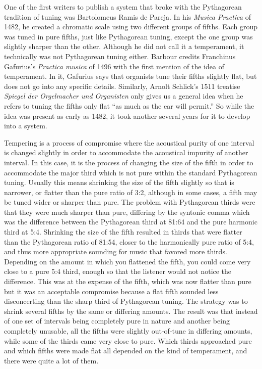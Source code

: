 One of the first writers to publish a system that broke with the Pythagorean
tradition of tuning was Bartolomeus Ramis de Pareja.  In his \textit{Musica Practica} of
1482, he created a chromatic scale using two different groups of fifths.  Each group was
tuned in pure fifths, just like Pythagorean tuning, except the one group was slightly
sharper than the other. \autocite[88]{MB:1}  Although he did not call it a temperament, it
technically was not Pythagorean tuning either.  Barbour credits Franchinus Gafurius's
\textit{Practica musica} of 1496 with the first mention of the idea of temperament.  In
it, Gafurius says that organists tune their fifths slightly flat, but does not go into any
specific details.\autocite[25]{MB:1} Similarly, Arnolt Schlick's 1511 treatise
\textit{Spiegel der Orgelmacher und Organisten} only gives us a general idea when he
refers to tuning the fifths only flat ``as much as the ear will permit.''
\autocite[202]{RR:1}  So while the idea was present as early as 1482, it took another
several years for it to develop into a system.

Tempering is a process of compromise where the acoustical purity of one interval is
changed slightly in order to accommodate the acoustical impurity of another interval.
In this case, it is the process of changing the size of the fifth in order to
accommodate the major third which is not pure within the standard Pythagorean tuning.
Usually this means shrinking the size of the fifth slightly so that is narrower, or
flatter than the pure ratio of 3:2, although in some cases, a fifth may be tuned wider or
sharper than pure. The problem with Pythagorean thirds were that they were much sharper
than pure, differing by the syntonic comma which was the difference between the
Pythagorean third at 81:64 and the pure harmonic third at 5:4. Shrinking the size of the
fifth resulted in thirds that were flatter than the Pythagorean ratio of 81:54, closer to
the harmonically pure ratio of 5:4, and thus more appropriate sounding for music that
favored more thirds. Depending on the amount in which you flattened the fifth, you could
come very close to a pure 5:4 third, enough so that the listener would not notice the
difference.  This was at the expense of the fifth, which was now flatter than pure but it
was an acceptable compromise because a flat fifth sounded less disconcerting than the
sharp third of Pythagorean tuning.  The strategy was to shrink several fifths by the same
or differing amounts. The result was that instead of one set of intervals being completely
pure in nature and another being completely unusable, all the fifths were slightly
out-of-tune in differing amounts, while some of the thirds came very close to pure. Which
thirds approached pure and which fifths were made flat all depended on the kind of
temperament, and there were quite a lot of them.

